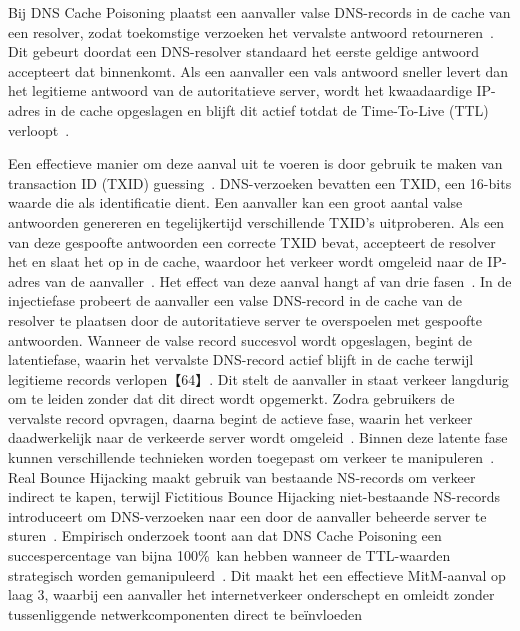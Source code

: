 Bij DNS Cache Poisoning plaatst een aanvaller valse DNS-records in de cache van een resolver, zodat toekomstige verzoeken het vervalste antwoord retourneren~\autocite{klein2020}. Dit gebeurt doordat een DNS-resolver standaard het eerste geldige antwoord accepteert dat binnenkomt. Als een aanvaller een vals antwoord sneller levert dan het legitieme antwoord van de autoritatieve server, wordt het kwaadaardige IP-adres in de cache opgeslagen en blijft dit actief totdat de Time-To-Live (TTL) verloopt~\autocite{klein2020}.

Een effectieve manier om deze aanval uit te voeren is door gebruik te maken van transaction ID (TXID) guessing~\autocite{klein2020}. DNS-verzoeken bevatten een TXID, een 16-bits waarde die als identificatie dient. Een aanvaller kan een groot aantal valse antwoorden genereren en tegelijkertijd verschillende TXID’s uitproberen. Als een van deze gespoofte antwoorden een correcte TXID bevat, accepteert de resolver het en slaat het op in de cache, waardoor het verkeer wordt omgeleid naar de IP-adres van de aanvaller~\autocite{klein2020}.
Het effect van deze aanval hangt af van drie fasen~\autocite{klein2020}. In de injectiefase probeert de aanvaller een valse DNS-record in de cache van de resolver te plaatsen door de autoritatieve server te overspoelen met gespoofte antwoorden. Wanneer de valse record succesvol wordt opgeslagen, begint de latentiefase, waarin het vervalste DNS-record actief blijft in de cache terwijl legitieme records verlopen【64】. Dit stelt de aanvaller in staat verkeer langdurig om te leiden zonder dat dit direct wordt opgemerkt. Zodra gebruikers de vervalste record opvragen, daarna begint de actieve fase, waarin het verkeer daadwerkelijk naar de verkeerde server wordt omgeleid~\autocite{klein2020}.
Binnen deze latente fase kunnen verschillende technieken worden toegepast om verkeer te manipuleren~\autocite{klein2020}. Real Bounce Hijacking maakt gebruik van bestaande NS-records om verkeer indirect te kapen, terwijl Fictitious Bounce Hijacking niet-bestaande NS-records introduceert om DNS-verzoeken naar een door de aanvaller beheerde server te sturen~\autocite{klein2020}.
Empirisch onderzoek toont aan dat DNS Cache Poisoning een succespercentage van bijna 100\%\ kan hebben wanneer de TTL-waarden strategisch worden gemanipuleerd~\autocite{klein2020}. Dit maakt het een effectieve MitM-aanval op laag 3, waarbij een aanvaller het internetverkeer onderschept en omleidt zonder tussenliggende netwerkcomponenten direct te beïnvloeden~\autocite{klein2020}




